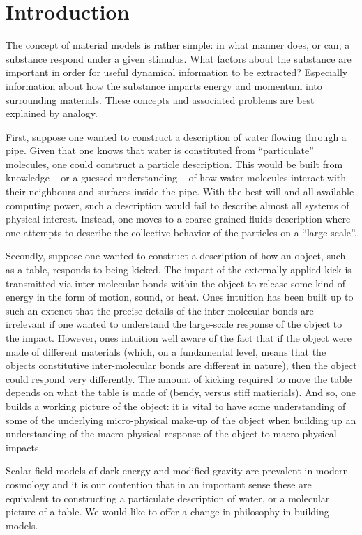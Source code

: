 \section{Introduction}
The concept of material models is rather simple: in what manner does, or can, a substance respond under a given stimulus. What factors about the substance are important in order for useful dynamical information to be extracted? Especially information about how the substance imparts energy and momentum into surrounding materials. These concepts and associated problems are best explained by analogy.


First, suppose one wanted to construct a description of water flowing through a pipe. Given that one knows that water is constituted from ``particulate'' molecules,  one could construct a particle description. This would be built from knowledge -- or a guessed understanding -- of how water molecules interact with their neighbours and surfaces inside the pipe. With the best will and all available computing power, such a description would fail to describe almost all systems of physical interest. Instead, one moves to a coarse-grained fluids description where one attempts to describe the collective behavior of the particles on a ``large scale''.  

Secondly, suppose one wanted to construct a description of how an object, such as a table, responds to being kicked. The impact of the externally applied kick is transmitted via inter-molecular bonds within the object to release some kind of energy in the form of motion, sound, or heat.  Ones intuition has been built up to such an extenet that the precise details of the inter-molecular bonds are irrelevant if one wanted to understand the large-scale response of the object to the impact. However, ones intuition well aware of the fact that if the object were made of different materials (which, on a fundamental level, means that the objects constitutive inter-molecular bonds are  different in nature), then the object could respond very differently. The amount of kicking required to move the table depends on what the table is made of (bendy, versus stiff matierials). And so, one builds a working picture of the object: it is vital to have some understanding of some of the underlying micro-physical make-up of the object when building up an understanding of the macro-physical response of the object to macro-physical impacts. 

Scalar field models of dark energy and modified gravity are prevalent in modern cosmology and it is our contention that in an important sense these are equivalent to constructing a particulate description of water, or a molecular picture of a table. We would like to offer a change in philosophy in building models.

